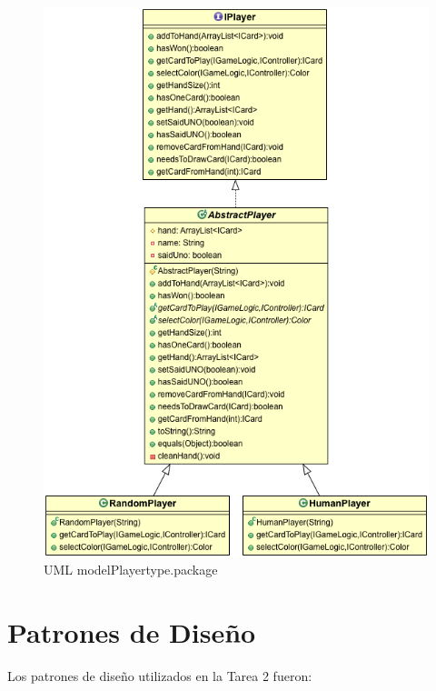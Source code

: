 \documentclass[letterpaper,11pt]{article}
\begin{document}
\begin{figure}[H]
\center
\includegraphics[scale=0.3]{modelPlayertype.png}
\caption{UML modelPlayertype.package}
\end{figure}

\newpage

\section{Patrones de Diseño}

Los patrones de diseño utilizados en la Tarea 2 fueron:
\end{document}
